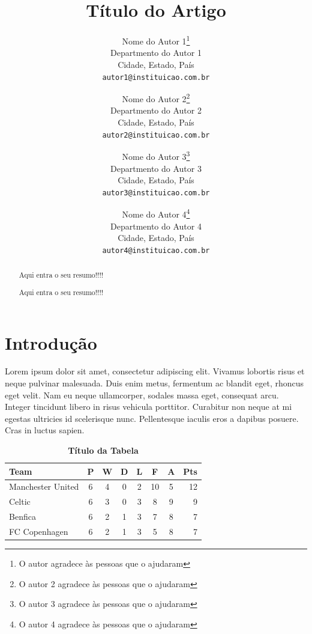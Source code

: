 \documentclass[12pt,oneside,a4paper]{article}			%
\title{Título do Artigo}
\author{Nome do Autor 1\thanks{O autor agradece às pessoas que o ajudaram}\\
\small Departmento do Autor 1\\[-0.8ex]
\small Cidade, Estado, País\\
\small \texttt{autor1@instituicao.com.br}\\
\and
Nome do Autor 2\thanks{O autor 2  agradece às pessoas que o ajudaram}\\
\small Departmento do Autor 2\\[-0.8ex]
\small Cidade, Estado, País\\
\small \texttt{autor2@instituicao.com.br}\\
\and
Nome do Autor 3\thanks{O autor 3  agradece às pessoas que o ajudaram}\\
\small Departmento do Autor 3\\[-0.8ex]
\small Cidade, Estado, País\\
\small \texttt{autor3@instituicao.com.br}\\
\and
Nome do Autor 4\thanks{O autor 4  agradece às pessoas que o ajudaram}\\
\small Departmento do Autor 4\\[-0.8ex]
\small Cidade, Estado, País\\
\small \texttt{autor4@instituicao.com.br}\\
}
\date{}%
\newcommand{\theabstract}{
\begin{abstract}


Aqui entra o seu resumo!!!!
\lipsum[1]


\end{abstract}
}
\begin{document}
\maketitle
\theabstract
\newpage
\thispagestyle{plain}
\setcounter{page}{1}
\begin{center}
{\LARGE \thetitle}
\theabstract
\end{center}
\newpage











\section{Introdução}

 Lorem ipsum dolor sit amet, consectetur adipiscing elit. Vivamus lobortis risus et neque pulvinar malesuada. Duis enim metus, fermentum ac blandit eget, rhoncus eget velit. Nam eu neque ullamcorper, sodales massa eget, consequat arcu. Integer tincidunt libero in risus vehicula porttitor. Curabitur non neque at mi egestas ultricies id scelerisque nunc. Pellentesque iaculis eros a dapibus posuere. Cras in luctus sapien\cite{article-crossref}.


\begin{table}[!h]
\centering
\caption{\textbf{Título da Tabela}}
\begin{tabular}{l |c|c|c|c|c|c| r}
\hline
Team              & P & W & D & L & F  & A & Pts \\
\hline
Manchester United & 6 & 4 & 0 & 2 & 10 & 5 & 12  \\
Celtic            & 6 & 3 & 0 & 3 &  8 & 9 &  9  \\
Benfica           & 6 & 2 & 1 & 3 &  7 & 8 &  7  \\
FC Copenhagen     & 6 & 2 & 1 & 3 &  5 & 8 &  7  \\ \hline
\end{tabular}
\end{table}
\end{document}
